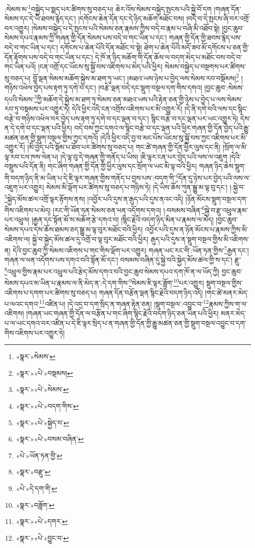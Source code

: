 :སེམས་མ་\footnote{«སྣར་»སེམས་}བསྐྱེད་པ་སྨད་པར་ཚིགས་སུ་བཅད་པ། ཆེར་འོས་སེམས་བསྐྱེད་སྤངས་པའི་སྐྱེ་བོ་དག །གཞན་དོན་སེམས་དང་དེ་ཡི་ཐབས་རྙེད་དང་། །དགོངས་ཆེན་དོན་དང་དེ་ཉིད་མཆོག་མཐོང་བས། །བདེ་བ་དེ་སྤངས་ཞི་བར་འགྲོ་བར་འགྱུར། །སེམས་བསྐྱེད་པ་དེ་སྤངས་པའི་སེམས་ཅན་རྣམས་ཀྱིས་བདེ་བ་རྣམ་པ་བཞི་མི་འཐོབ་སྟེ། །བྱང་ཆུབ་སེམས་དཔའ་རྣམས་ཀྱི་གཞན་གྱི་དོན་སེམས་པས་བདེ་བ་གང་ཡིན་པ་དང་། གཞན་གྱི་དོན་གྱི་ཐབས་རྙེད་པས་བདེ་བ་གང་ཡིན་པ་དང་། དགོངས་པ་ཆེན་པོའི་དོན་མཐོང་བ་སྟེ། ཐེག་པ་ཆེན་པོའི་མདོ་ཟབ་མོ་དགོངས་པ་ཅན་གྱི་དོན་རྟོགས་པས་བདེ་བ་གང་ཡིན་པ་དང་། དེ་ཁོ་ན་ཉིད་མཆོག་གི་དོན་ཆོས་ལ་བདག་མེད་པ་མཐོང་བས་བདེ་བ་གང་ཡིན་པའོ། །ངན་འགྲོ་དང་ཡོངས་སུ་སྐྱོ་བས་འཇིགས་པ་མེད་པའི་ཕྱིར། སེམས་བསྐྱེད་པ་བསྔགས་པར་ཚིགས་སུ་བཅད་པ། བློ་ལྡན་སེམས་མཆོག་སྐྱེས་མ་ཐག་ཏུ་ཡང་། །མཐའ་ཡས་ཉེས་པ་བྱེད་ལས་སེམས་རབ་བསྡོམས།\footnote{«སྣར་»«པེ་»བསྡམས།} །གཉིས་འཕེལ་བྱེད་པས་རྟག་ཏུ་དགེ་བ་དང་། །བརྩེ་ལྡན་བདེ་དང་སྡུག་བསྔལ་དག་གིས་དགའ། །བྱང་ཆུབ་:སེམས་དཔའི་སེམས་\footnote{«སྣར་»«པེ་»སེམས་}ཀྱི་མཆོག་དེ་སྐྱེས་མ་ཐག་ཏུ་སེམས་ཅན་མཐའ་ཡས་པའི་རྟེན་ཅན་གྱི་ཉེས་པ་བྱེད་པ་ལས་སེམས་རབ་ཏུ་བསྡམས་པར་འགྱུར་ཏེ། དེའི་ཕྱིར་འདི་ངན་འགྲོས་འཇིགས་པར་མི་འགྱུར་རོ། །དེ་ནི་དགེ་བའི་ལས་དང་སྙིང་བརྩེ་བ་གཉིས་འཕེལ་བར་བྱེད་པས་རྟག་ཏུ་དགེ་བ་དང་ལྡན་བ་དང་། སྙིང་བརྩེ་བ་དང་ལྡན་པར་ཡང་འགྱུར་ཏེ། དེས་ན་དེ་དགེ་བ་དང་ལྡན་པའི་ཕྱིར། བདེ་བས་ཀྱང་དགའ་ལ་སྙིང་བརྩེ་བ་དང་ལྡན་པའི་ཕྱིར་གཞན་གྱི་དོན་བྱེད་པའི་རྒྱུ་མཚན་ཅན་གྱི་སྡུག་བསྔལ་གྱིས་ཀྱང་དགའོ། །དེའི་ཕྱིར་འདི་བྱ་བ་མང་པོས་ཡོངས་སུ་སྐྱོ་བས་ཀྱང་འཇིགས་པར་མི་འགྱུར་རོ། །མི་བྱེད་པའི་སྡོམ་པ་ཐོབ་པར་ཚིགས་སུ་བཅད་པ། གང་ཚེ་གཞན་གྱི་དོན་ཕྱིར་ལུས་དང་ནི། །སྲོག་ལ་མི་ལྟ་རབ་ངལ་ཁས་ལེན་པ། །དེ་ལྟ་བུ་དེ་གཞན་གྱི་གནོད་པ་ཡིས། །ཇི་ལྟར་ངན་པར་བྱེད་པའི་ལས་ལ་འཇུག །དེའི་བསྡུས་པའི་དོན་ནི། གང་ཞིག་གཞན་གྱི་དོན་གྱི་ཕྱིར་ལུས་དང་སྲོག་ལ་ཡང་མི་ལྟ་བའི་ཕྱིར། གཞན་ཉིད་ཆེས་སྡུག་གི་བདག་ཉིད་ནི་མ་ཡིན་པ་དེ་ཇི་ལྟར་གཞན་གྱིས་གནོད་པ་བྱས་པས་:བདག་གི་\footnote{«སྣར་»«པེ་»བདག་གིས་}དོན་དུ་ཉེས་པར་བྱེད་པའི་ལས་ལ་འཇུག་པར་འགྱུར། སེམས་མི་ལྡོག་པར་ཚིགས་སུ་བཅད་པ་གཉིས་ཏེ། །དེ་ཡིས་ཆོས་ཀུན་སྒྱུ་མ་ལྟ་བུ་དང་། །:སྐྱེ་བ་\footnote{«སྣར་»«པེ་»སྐྱེད་བ་}སྐྱེད་མོས་ཚལ་འགྲོ་ལྟར་རྟོགས་ནས། །འབྱོར་པའི་དུས་ན་རྒུད་པའི་དུས་ནའང་འདི། །ཉོན་མོངས་སྡུག་བསྔལ་དག་གིས་འཇིགས་པ་མེད། །རང་གི་ཡོན་ཏན་སེམས་ཅན་ཕན་འདོགས་དགའ། །:བསམས་བཞིན་\footnote{«སྣར་»«པེ་»བསམ་བཞིན་}སྐྱེ་བ་རྫུ་འཕྲུལ་རྣམ་པར་འཕྲུལ། །རྒྱན་དང་སྟོན་མོ་ས་མཆོག་རྩེ་དགའ་བ། །སྙིང་རྗེའི་བདག་ཉིད་མིན་པ་རྣམས་ལ་མེད། །བྱང་ཆུབ་སེམས་དཔའ་དེས་ཆོས་ཐམས་ཅད་སྒྱུ་མ་ལྟ་བུར་མཐོང་བའི་ཕྱིར། འབྱོར་པའི་དུས་ན་ཉོན་མོངས་པ་རྣམས་ཀྱིས་མི་འཇིགས་ལ། སྐྱེ་བ་སྐྱེད་མོས་ཚལ་དུ་འགྲོ་བ་ལྟ་བུར་མཐོང་བའི་ཕྱིར། རྒུད་པའི་དུས་ན་སྡུག་བསྔལ་གྱིས་མི་འཇིགས་ན། དེའི་བྱང་ཆུབ་ཀྱི་སེམས་འཇིགས་པ་གང་གིས་ལྡོག་པར་འགྱུར། གཞན་ཡང་རང་གི་:ཡོན་ཏན་གྱིས་\footnote{«པེ་»ཡོན་ཏན་གྱི་}རྒྱན་དང་། གཞན་ལ་ཕན་འདོགས་པས་དགའ་བའི་སྟོན་མོ་དང་། བསམས་བཞིན་དུ་སྐྱེ་བའི་སྐྱེད་མོས་ཚལ་གྱི་ས་དང་། རྫུ་\footnote{«སྣར་»བརྫུ་}འཕྲུལ་གྱིས་རྣམ་པར་འཕྲུལ་པའི་རྩེད་མོས་དགའ་བའི་བྱང་ཆུབ་སེམས་དཔའ་དག་ཁོ་ན་ལ་ཡོད་ཀྱི། བྱང་ཆུབ་སེམས་དཔའ་མ་ཡིན་པ་རྣམས་ལ་ནི་མེད་ན་:དེ་དག་གིས་\footnote{«པེ་»དེ་དག་གི་}སེམས་ཇི་ལྟར་ཟློག་\footnote{«སྣར་»བཟློག་}པར་འགྱུར། སྡུག་བསྔལ་གྱིས་འཇིགས་པ་དགག་པར་ཚིགས་སུ་བཅད་པ། གཞན་དོན་བརྩོན་ལྡན་སྙིང་རྗེའི་བདག་ཉིད་འདི། །གང་ཚེ་མནར་མེད་པ་ལའང་དགའ་\footnote{«སྣར་»«པེ་»དགར་}འཛིན་པ། །དེ་འདྲ་བ་དག་སྲིད་ན་གཞན་རྟེན་ཅན། །སྡུག་བསྔལ་:འབྱུང་བ་\footnote{«སྣར་»«པེ་»བྱུང་བ་}རྣམས་ཀྱིས་ག་ལ་འཇིགས། །གཞན་ཡང་གཞན་གྱི་དོན་ལ་བརྩོན་པ་གང་ཞིག་སྙིང་རྗེའི་བདག་ཉིད་ཅན་ཡིན་པའི་ཕྱིར། མནར་མེད་པ་ལ་ཡང་དགའ་བར་འཛིན་པ་དེ་ཇི་ལྟར་སྲིད་པ་ན་གཞན་གྱི་དོན་གྱི་རྒྱུ་མཚན་ཅན་གྱི་སྡུག་བསྔལ་འབྱུང་བ་དག་གིས་འཇིགས་པར་འགྱུར་ཏེ། 